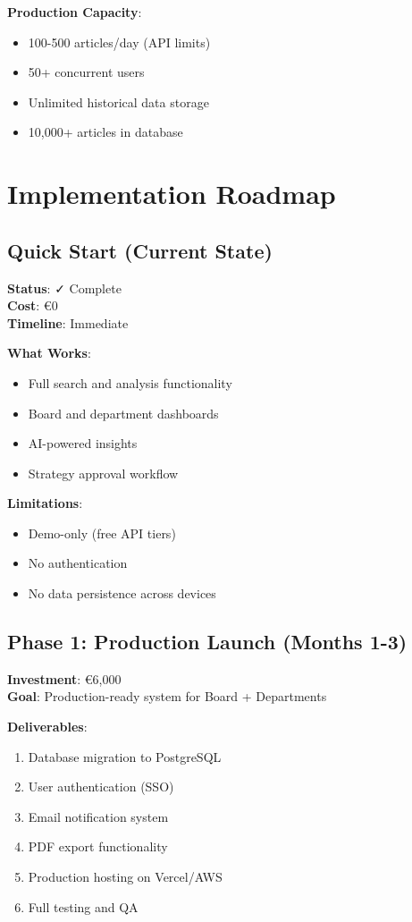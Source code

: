\documentclass[11pt,a4paper]{article}
\begin{document}
\textbf{Production Capacity}:
\begin{itemize}[leftmargin=*]
    \item 100-500 articles/day (API limits)
    \item 50+ concurrent users
    \item Unlimited historical data storage
    \item 10,000+ articles in database
\end{itemize}

\section{Implementation Roadmap}

\subsection{Quick Start (Current State)}
\textbf{Status}: ✓ Complete\\
\textbf{Cost}: \euro 0\\
\textbf{Timeline}: Immediate

\textbf{What Works}:
\begin{itemize}[leftmargin=*]
    \item Full search and analysis functionality
    \item Board and department dashboards
    \item AI-powered insights
    \item Strategy approval workflow
\end{itemize}

\textbf{Limitations}:
\begin{itemize}[leftmargin=*]
    \item Demo-only (free API tiers)
    \item No authentication
    \item No data persistence across devices
\end{itemize}

\subsection{Phase 1: Production Launch (Months 1-3)}
\textbf{Investment}: \euro 6,000\\
\textbf{Goal}: Production-ready system for Board + Departments

\textbf{Deliverables}:
\begin{enumerate}[leftmargin=*]
    \item Database migration to PostgreSQL
    \item User authentication (SSO)
    \item Email notification system
    \item PDF export functionality
    \item Production hosting on Vercel/AWS
    \item Full testing and QA
\end{enumerate}
\end{document}
